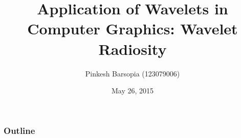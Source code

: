 \documentclass{beamer}
\begin{document}
\title{Application of Wavelets in Computer Graphics: Wavelet Radiosity}  
\author{Pinkesh Barsopia (123079006) }
\date{May 26, 2015}


\begin{frame}
\titlepage
\end{frame}
\begin{frame}[shrink]\frametitle{Outline}
\tableofcontents
\end{frame} 


\end{document}
